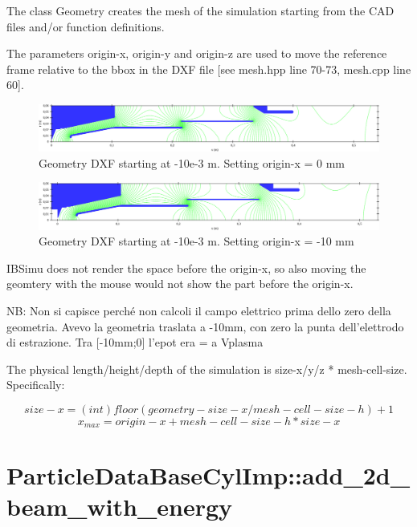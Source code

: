 \documentclass[12pt,a4paper]{article}
\begin{document}
The class Geometry creates the mesh of the simulation starting from the CAD files and/or function definitions.

The parameters origin-x, origin-y and origin-z are used to move the reference frame relative to the bbox in the DXF file [see mesh.hpp line 70-73, mesh.cpp line 60].


\begin{figure}
	\centering
	\includegraphics[width=0.7\linewidth]{"assets/geometry_origin_x_zero.png"}
	\caption[Origin X = 0]{Geometry DXF starting at -10e-3 m. Setting origin-x = 0 mm}
	\label{fig:esempio-origin-xzero}
\end{figure}

\begin{figure}
	\centering
	\includegraphics[width=0.7\linewidth]{"assets/geometry_origin_x_minus10mm.png"}
	\caption[Origin X = 0]{Geometry DXF starting at -10e-3 m. Setting origin-x = -10 mm}
	\label{fig:esempio-origin-xzero}
\end{figure}


IBSimu does not render the space before the origin-x, so also moving the geomtery with the mouse would not show the part before the origin-x.

NB: Non si capisce perché non calcoli il campo elettrico prima dello zero della geometria. Avevo la geometria traslata a -10mm, con zero la punta dell'elettrodo di estrazione. Tra [-10mm;0] l'epot era = a Vplasma



The physical length/height/depth of the simulation is size-x/y/z * mesh-cell-size. Specifically:

$$size-x = (int)floor(geometry-size-x / mesh-cell-size-h) + 1 $$
$$x_{max} = origin-x + mesh-cell-size-h * size-x$$







\section{ParticleDataBaseCylImp::add\_2d\_beam\_with\_energy}
\end{document}
